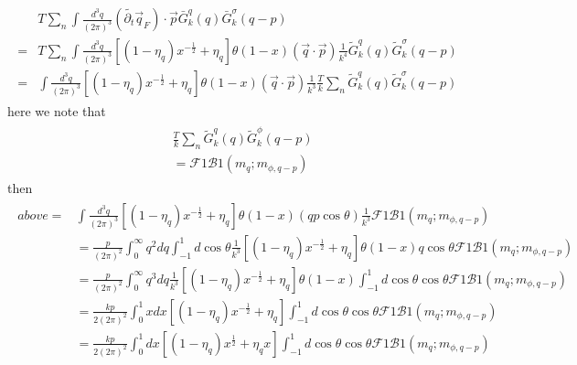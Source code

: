 \documentclass[12pt]{article}
\begin{document}
\begin{eqnarray}
\begin{split}
&T \sum_n\int \frac{d^3q}{(2 \pi)^3} (\tilde{\partial_t} \vec{q}_F)\cdot  \vec{p} \bar G^q_k (q) \bar G^{\sigma}_k(q-p) \\
=&T \sum_n \int \frac{d^3q}{(2 \pi)^3}[(1-\eta_q)x^{-\frac{1}{2}} + \eta_q] \theta(1-x) (\vec{q}  \cdot \vec{p}) \frac{1}{k^4} \tilde G^q_k(q) \tilde G^{\sigma}_k(q-p)\\
=& \int \frac{d^3q}{(2 \pi)^3}[(1-\eta_q)x^{-\frac{1}{2}} + \eta_q] \theta(1-x) (\vec{q}  \cdot \vec{p}) \frac{1}{k^3} \frac{T}{k} \sum_n\tilde G^q_k(q) \tilde G^{\sigma}_k(q-p)
\end{split}
\end{eqnarray}
here we note that
\begin{eqnarray}
\begin{split}
&\frac{T}{k} \sum_n \tilde G^q_k(q) \tilde G^{\phi}_k(q-p) \\
&=\mathcal{F}1\mathcal{B}1(m_q;m_{\phi,q-p})
\end{split}
\end{eqnarray}
then
\begin{eqnarray}
\begin{split}
above=& \int \frac{d^3q}{(2 \pi)^3}[(1-\eta_q)x^{-\frac{1}{2}} + \eta_q] \theta(1-x) (q p \cos \theta) \frac{1}{k^3} \mathcal{F}1\mathcal{B}1(m_q;m_{\phi,q-p})\\
&=\frac{p}{(2 \pi)^2}\int _0^{\infty}q^2 dq \int_{-1}^{1} d \cos \theta \frac{1}{k^3} [(1-\eta_q)x^{-\frac{1}{2}} + \eta_q] \theta(1-x) q \cos \theta \mathcal{F}1\mathcal{B}1(m_q;m_{\phi,q-p})\\
&=\frac{p}{(2 \pi)^2}\int _0^{\infty}q^3 dq  \frac{1}{k^3} [(1-\eta_q)x^{-\frac{1}{2}} + \eta_q] \theta(1-x)  \int_{-1}^{1} d \cos \theta \cos \theta \mathcal{F}1\mathcal{B}1(m_q;m_{\phi,q-p})\\
&=\frac{k p}{2 (2 \pi)^2}\int _0^1 x dx  [(1-\eta_q)x^{-\frac{1}{2}} + \eta_q] \int_{-1}^{1} d \cos \theta \cos \theta \mathcal{F}1\mathcal{B}1(m_q;m_{\phi,q-p})\\
&=\frac{k p}{2 (2 \pi)^2}\int _0^1 dx  [(1-\eta_q)x^{\frac{1}{2}} + \eta_q x] \int_{-1}^{1} d \cos \theta \cos \theta \mathcal{F}1\mathcal{B}1(m_q;m_{\phi,q-p})
\end{split}
\end{eqnarray}







\end{document}
